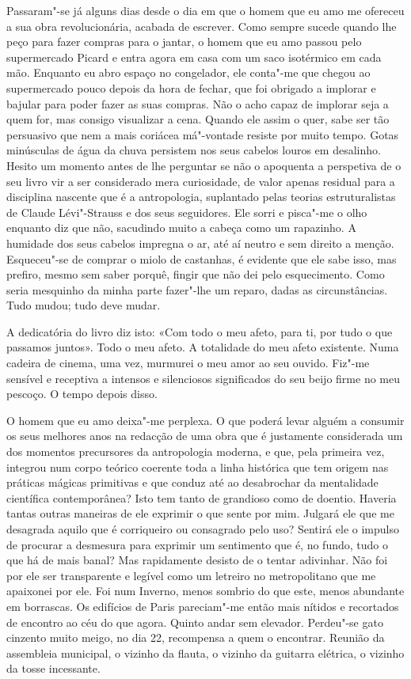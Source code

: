 Passaram"-se já alguns dias desde o dia em que o homem que eu amo me
ofereceu a sua obra revolucionária, acabada de escrever. Como sempre
sucede quando lhe peço para fazer compras para o jantar, o homem que eu
amo passou pelo supermercado Picard e entra agora em casa com um saco
isotérmico em cada mão. Enquanto eu abro espaço no congelador, ele
conta"-me que chegou ao supermercado pouco depois da hora de fechar, que
foi obrigado a implorar e bajular para poder fazer as suas compras. Não
o acho capaz de implorar seja a quem for, mas consigo visualizar a cena.
Quando ele assim o quer, sabe ser tão persuasivo que nem a mais coriácea má"-vontade resiste por muito tempo. Gotas minúsculas de água da
chuva persistem nos seus cabelos louros em desalinho. Hesito um momento
antes de lhe perguntar se não o apoquenta a perspetiva de o seu livro
vir a ser considerado mera curiosidade, de valor apenas residual para a
disciplina nascente que é a antropologia, suplantado pelas teorias
estruturalistas de Claude Lévi"-Strauss e dos seus seguidores. Ele sorri
e pisca"-me o olho enquanto diz que não, sacudindo muito a cabeça como um
rapazinho. A humidade dos seus cabelos impregna o ar, até aí neutro e
sem direito a menção. Esqueceu"-se de comprar o miolo de castanhas, é
evidente que ele sabe isso, mas prefiro, mesmo sem saber porquê, fingir
que não dei pelo esquecimento. Como seria mesquinho da minha parte
fazer"-lhe um reparo, dadas as circunstâncias. Tudo mudou; tudo deve mudar.

A dedicatória do livro diz isto: «Com todo o meu afeto, para ti, por
tudo o que passamos juntos». Todo o meu afeto.
A totalidade do meu afeto existente. Numa cadeira de cinema, uma vez,
murmurei o meu amor ao seu ouvido. Fiz"-me sensível e receptiva a
intensos e silenciosos significados do seu beijo firme no meu pescoço. O
tempo depois disso.

O homem que eu amo deixa"-me perplexa. O que poderá levar alguém a
consumir os seus melhores anos na redacção de uma obra que é justamente
considerada um dos momentos precursores da antropologia moderna, e que,
pela primeira vez, integrou num corpo teórico coerente toda a linha
histórica que tem origem nas práticas mágicas primitivas e que conduz
até ao desabrochar da mentalidade científica contemporânea? Isto tem
tanto de grandioso como de doentio. Haveria tantas outras maneiras de
ele exprimir o que sente por mim. Julgará ele que me desagrada aquilo
que é corriqueiro ou consagrado pelo uso? Sentirá ele o impulso de
procurar a desmesura para exprimir um sentimento que é, no fundo, tudo o
que há de mais banal? Mas rapidamente desisto de o tentar adivinhar. Não
foi por ele ser transparente e legível como um letreiro no metropolitano
que me apaixonei por ele. Foi num Inverno, menos sombrio do que este,
menos abundante em borrascas. Os edifícios de Paris pareciam"-me então
mais nítidos e recortados de encontro ao céu do que agora. Quinto andar
sem elevador. Perdeu"-se gato cinzento muito meigo, no dia 22, recompensa
a quem o encontrar. Reunião da assembleia municipal, o vizinho da
flauta, o vizinho da guitarra elétrica, o vizinho da tosse incessante.

